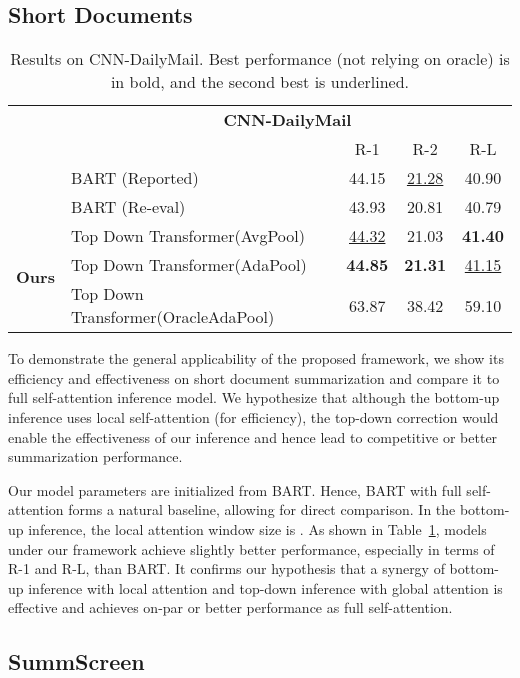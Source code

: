 \documentclass{article} \usepackage{iclr2022_conference,times}
\newcommand{\todof}{{Top Down Transformer}\xspace} \newcommand{\todofull}{{Top Down Transformer}\xspace} \newcommand\todo[1]{\textcolor{red}{(#1)}}
\begin{document}
\subsection{Short Documents}

\begin{table}[h!]
\small
\centering
\begin{tabular}{c l c c c} 
\toprule
& \multicolumn{4}{c}{\textbf{CNN-DailyMail}}\\
& & R-1 & R-2 & R-L \\
\hline
& BART (Reported) & 44.15 & \underline{21.28} & 40.90 \\ 
& BART (Re-eval) & 43.93 & 20.81 & 40.79 \\ 
\hline
\multirow{3}{*}{\bf Ours} & \todof (AvgPool) & \underline{44.32} & 21.03 & \textbf{41.40} \\ 
    & \todof (AdaPool) & \textbf{44.85} & \textbf{21.31} & \underline{41.15} \\ \cline{2-5}
    & \todof (OracleAdaPool) & 63.87 & 38.42 & 59.10 \\ 
\hline
\end{tabular}
\caption{\scriptsize Results on CNN-DailyMail. Best performance (not relying on oracle) is in bold, and the second best is underlined.}
\label{table:cnn}
\end{table}


To demonstrate the general applicability of the proposed framework, we show its efficiency and effectiveness on short document summarization and compare it to full self-attention inference model. We hypothesize that although the bottom-up inference uses local self-attention (for efficiency), the top-down correction would enable the effectiveness of our inference and hence lead to competitive or better summarization performance. 


Our model parameters are initialized from BART. Hence, BART with full self-attention forms a natural baseline, allowing for direct comparison. In the bottom-up inference, the local attention window size is . As shown in Table~\ref{table:cnn}, models under our framework achieve slightly better performance, especially in terms of R-1 and R-L, than BART. It confirms our hypothesis that a synergy of bottom-up inference with local attention and top-down inference with global attention is effective and achieves on-par or better performance as full self-attention.




\subsection{SummScreen}
\end{document}
